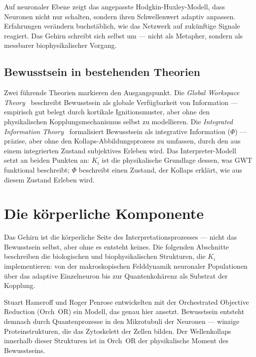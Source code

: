 \documentclass[11pt,a4paper]{article}
\begin{document}
Auf neuronaler Ebene zeigt das angepasste Hodgkin-Huxley-Modell, dass Neuronen nicht
nur schalten, sondern ihren Schwellenwert adaptiv anpassen. Erfahrungen verändern
buchstäblich, wie das Netzwerk auf zukünftige Signale reagiert. Das Gehirn schreibt
sich selbst um — nicht als Metapher, sondern als messbarer biophysikalischer Vorgang.

\subsection*{Bewusstsein in bestehenden Theorien}

Zwei führende Theorien markieren den Ausgangspunkt. Die \emph{Global Workspace
Theory}~\citep{dehaene2011} beschreibt Bewusstsein als globale Verfügbarkeit von
Information — empirisch gut belegt durch kortikale Ignitionsmuster, aber ohne den
physikalischen Kopplungsmechanismus selbst zu modellieren. Die \emph{Integrated
Information Theory}~\citep{tononi2004} formalisiert Bewusstsein als integrative
Information ($\Phi$) — präzise, aber ohne den Kollaps-Abbildungsprozess zu
umfassen, durch den aus einem integrierten Zustand subjektives Erleben wird.
Das Interpreter-Modell setzt an beiden Punkten an: $K_i$ ist die physikalische
Grundlage dessen, was GWT funktional beschreibt; $\Phi$ beschreibt einen Zustand,
der Kollaps erklärt, wie aus diesem Zustand Erleben wird.

\section{Die körperliche Komponente}
\label{sec:bio}

Das Gehirn ist die körperliche Seite des Interpretationsprozesses — nicht das
Bewusstsein selbst, aber ohne es entsteht keines. Die folgenden Abschnitte beschreiben
die biologischen und biophysikalischen Strukturen, die $K_i$ implementieren: von der
makroskopischen Felddynamik neuronaler Populationen über das adaptive Einzelneuron
bis zur Quantenkohärenz als Substrat der Kopplung.

Stuart Hameroff und Roger Penrose entwickelten mit der Orchestrated Objective
Reduction (Orch~OR) ein Modell, das genau hier ansetzt.
Bewusstsein entsteht demnach durch Quantenprozesse in den Mikrotubuli der Neuronen —
winzige Proteinstrukturen, die das Zytoskelett der Zellen bilden. Der Wellenkollaps
innerhalb dieser Strukturen ist in Orch~OR der physikalische Moment des Bewusstseins.
\end{document}
